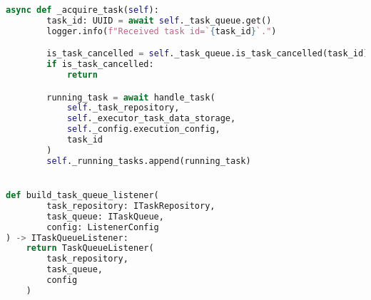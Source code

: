\begin{lstlisting}[language=Python, caption=execution/listener.py, captionpos=b]
    async def _acquire_task(self):
        task_id: UUID = await self._task_queue.get()
        logger.info(f"Received task id=`{task_id}`.")

        is_task_cancelled = self._task_queue.is_task_cancelled(task_id)
        if is_task_cancelled:
            return

        running_task = await handle_task(
            self._task_repository,
            self._executor_task_data_storage,
            self._config.execution_config,
            task_id
        )
        self._running_tasks.append(running_task)


def build_task_queue_listener(
        task_repository: ITaskRepository,
        task_queue: ITaskQueue,
        config: ListenerConfig
) -> ITaskQueueListener:
    return TaskQueueListener(
        task_repository,
        task_queue,
        config
    )
\end{lstlisting}
